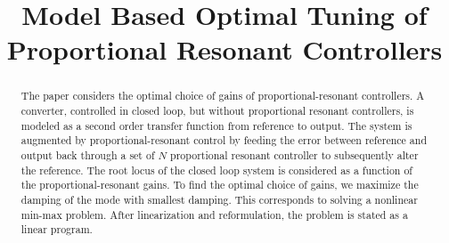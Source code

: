 \documentclass[conference,10pt]{IEEEtran}
\begin{document}
%


\title{Model Based Optimal Tuning of Proportional Resonant Controllers}



\author{
\IEEEauthorblockA{  }
\IEEEauthorblockE{}}


%



\maketitle


\begin{abstract}
The paper considers the optimal choice of gains of proportional-resonant controllers. A converter, controlled in closed loop, but without proportional resonant controllers, is modeled as a second order transfer function from reference to output. The system is augmented by proportional-resonant control by feeding the error between reference and output back through a set of $N$ proportional resonant controller to subsequently alter the reference. The root locus of the closed loop system is considered as a function of the proportional-resonant gains. To find the optimal choice of gains, we maximize the damping of the mode with smallest damping. This corresponds to solving a nonlinear min-max problem. After linearization and reformulation, the problem is stated as a linear program.
\end{abstract}
\end{document}
